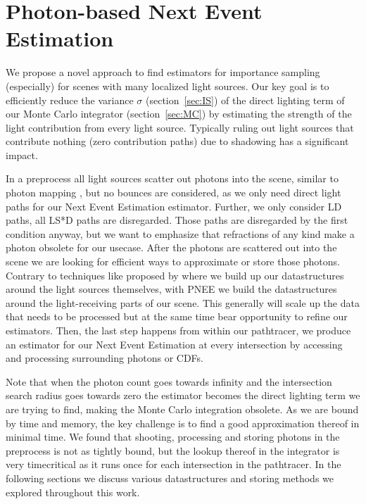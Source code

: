 
\chapter{Photon-based Next Event Estimation}
\label{ch:PNEE}

We propose a novel approach to find estimators for importance sampling (especially) for scenes with many localized light sources. Our key goal is to efficiently reduce the variance $\sigma$ (section~\ref{sec:IS}) of the direct lighting term of our Monte Carlo integrator (section~\ref{sec:MC}) by estimating the strength of the light contribution from every light source. Typically ruling out light sources that contribute nothing (zero contribution paths) due to shadowing has a significant impact.

In a preprocess all light sources scatter out photons into the scene, similar to photon mapping \cite{jensen2001realistic}, but no bounces are considered, as we only need direct light paths for our Next Event Estimation estimator. Further, we only consider LD paths, all LS*D paths are disregarded. Those paths are disregarded by the first condition anyway, but we want to emphasize that refractions of any kind make a photon obsolete for our usecase. After the photons are scattered out into the scene we are looking for efficient ways to approximate or store those photons. Contrary to techniques like proposed by \cite{Estevez} where we build up our datastructures around the light sources themselves, with PNEE we build the datastructures around the light-receiving parts of our scene. This generally will scale up the data that needs to be processed but at the same time bear opportunity to refine our estimators. Then, the last step happens from within our pathtracer, we produce an estimator for our Next Event Estimation at every intersection by accessing and processing surrounding photons or CDFs.

Note that when the photon count goes towards infinity and the intersection search radius goes towards zero the estimator becomes the direct lighting term we are trying to find, making the Monte Carlo integration obsolete. As we are bound by time and memory, the key challenge is to find a good approximation thereof in minimal time. We found that shooting, processing and storing photons in the preprocess is not as tightly bound, but the lookup thereof in the integrator is very timecritical as it runs once for each intersection in the pathtracer. In the following sections we discuss various datastructures and storing methods we explored throughout this work.

